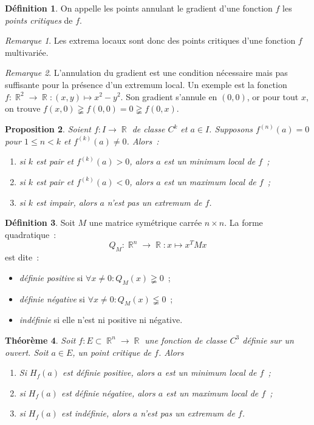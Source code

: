\documentclass{article}
\DeclareMathOperator{\R}{\mathbb R}
\newtheorem{thm}{Théorème}[section]
\newtheorem{prp}[thm]{Proposition}
\theoremstyle{definition}
\newtheorem{déf}[thm]{Définition}
\theoremstyle{remark}
\newtheorem*{rmq}{Remarque}
\begin{document}
		\begin{déf} On appelle les points annulant le gradient d'une fonction $f$ les \emph{points critiques} de $f$.
		\end{déf}

		\begin{rmq} Les extrema locaux sont donc des points critiques d'une fonction $f$ multivariée. \end{rmq}

		\begin{rmq} L'annulation du gradient est une condition nécessaire mais pas suffisante pour la présence d'un extremum local. Un exemple est la fonction
		$f : \R^2 \to \R : (x, y) \mapsto x^2 - y^2$. Son gradient s'annule en $(0, 0)$, or pour tout $x$, on trouve $f(x, 0) \gneqq f(0, 0) = 0 \gneqq f(0, x)$.
		\end{rmq}

		\begin{prp} Soient $f : I \to \R$ de classe $C^k$ et $a \in I$. Supposons $f^{(n)}(a) = 0$ pour $1 \leq n < k$ et $f^{(k)}(a) \neq 0$. Alors~:
		\begin{enumerate}
			\item si $k$ est pair et $f^{(k)}(a) > 0$, alors $a$ est un minimum local de $f$~;
			\item si $k$ est pair et $f^{(k)}(a) < 0$, alors $a$ est un maximum local de $f$~;
			\item si $k$ est impair, alors $a$ n'est pas un extremum de $f$.
		\end{enumerate}
		\end{prp}

		\begin{déf} Soit $M$ une matrice symétrique carrée $n \times n$. La forme quadratique~:
		\[Q_M : \R^n \to \R : x \mapsto x^TMx\]
		est dite~:
		\begin{itemize}
			\item \emph{définie positive} si $\forall x \neq 0 : Q_M(x) \gneqq 0$~;
			\item \emph{définie négative} si $\forall x \neq 0 : Q_M(x) \lneqq 0$~;
			\item \emph{indéfinie} si elle n'est ni positive ni négative.
		\end{itemize}
		\end{déf}

		\begin{thm} Soit $f : E \subset \R^n \to \R$ une fonction de classe $C^3$ définie sur un ouvert. Soit $a \in E$, un point critique de $f$. Alors
		\begin{enumerate}
			\item Si $H_f(a)$ est définie positive, alors $a$ est un minimum local de $f$~;
			\item si $H_f(a)$ est définie négative, alors $a$ est un maximum local de $f$~;
			\item si $H_f(a)$ est indéfinie, alors $a$ n'est pas un extremum de $f$.
		\end{enumerate}
		\end{thm}
\end{document}
